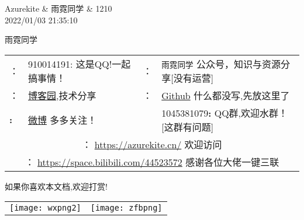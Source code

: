 \begin{flushright}
	Azurekite \& 雨霓同学 \& 1210 \\
	2022/01/03 21:35:10
\end{flushright}
{\large
	   雨霓同学\\
}
\begin{sBox}
	\begin{center}
		\noindent\footnotesize\begin{tabular}{@{}l@{ }l|l@{ }l@{}}
			\textcolor[RGB]{18,183,245}{\faQq}：&910014191:  这是QQ!一起搞事情！\faSendO   & \textcolor[RGB]{9,187,7}{\faWeixin}：&\verb|雨霓同学|  公众号，知识与资源分享[没有运营]\faSendO \\
			\textcolor[RGB]{0,194,255}{\faInternetExplorer}：& \href{https://www.cnblogs.com/1210x1184/}{ 博客园},技术分享  & {\textcolor[RGB]{39,165,188}{\faGithubAlt}}：& \href{https://github.com/Azure1210/}{Github}  什么都没写,先放这里了 \\
			\textcolor[RGB]{18,183,245}{\faWeibo}\textbf{:} & \href{https://weibo.com/u/5713129191}{微博} \faSendO 多多关注！ &\textcolor[RGB]{18,183,245}{\faUsers} &1045381079\textbf{:}  QQ群,欢迎水群！[这群有问题]\faSendO \\
			\multicolumn{4}{c}{\textcolor[RGB]{252,74,35}{\faSkyatlas}： \url{https://azurekite.cn/} \faSendO 欢迎访问\faSendO}
		\\[1pt]
			\multicolumn{4}{c}{\textcolor[RGB]{252,74,35}{\faTv}： \url{https://space.bilibili.com/44523572} \faSendO 感谢各位大佬一键三联\faSendO}\\ 
		\end{tabular}
	\end{center}
\begin{center}	
如果你喜欢本文档,欢迎打赏! \\[2pt]
	\begin{tabular}{cc}
\texttt{[image: wxpng2]}   &
\texttt{[image: zfbpng]}  
	\end{tabular}
\end{center}
\end{sBox}

